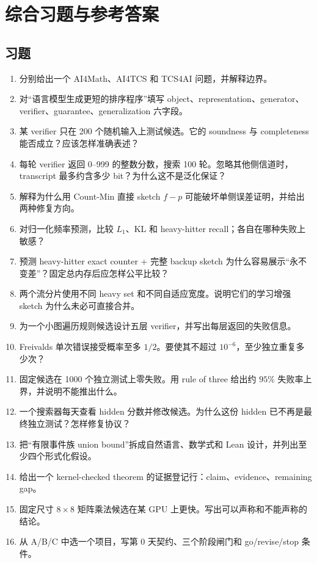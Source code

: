 \chapter{综合习题与参考答案}

\section{习题}

\begin{enumerate}[label=\textbf{X\arabic*.}]
  \item 分别给出一个 AI4Math、AI4TCS 和 TCS4AI 问题，并解释边界。
  \item 对“语言模型生成更短的排序程序”填写 object、representation、generator、verifier、guarantee、generalization 六字段。
  \item 某 verifier 只在 200 个随机输入上测试候选。它的 soundness 与 completeness 能否成立？应该怎样准确表述？
  \item 每轮 verifier 返回 0--999 的整数分数，搜索 100 轮。忽略其他侧信道时，transcript 最多约含多少 bit？为什么这不是泛化保证？
  \item 解释为什么用 Count-Min 直接 sketch $f-p$ 可能破坏单侧误差证明，并给出两种修复方向。
  \item 对归一化频率预测，比较 $L_1$、KL 和 heavy-hitter recall；各自在哪种失败上敏感？
  \item 预测 heavy-hitter exact counter + 完整 backup sketch 为什么容易展示“永不变差”？固定总内存后应怎样公平比较？
  \item 两个流分片使用不同 heavy set 和不同自适应宽度。说明它们的学习增强 sketch 为什么未必可直接合并。
  \item 为一个小图遍历规则候选设计五层 verifier，并写出每层返回的失败信息。
  \item Freivalds 单次错误接受概率至多 $1/2$。要使其不超过 $10^{-6}$，至少独立重复多少次？
  \item 固定候选在 1000 个独立测试上零失败。用 rule of three 给出约 $95\%$ 失败率上界，并说明不能推出什么。
  \item 一个搜索器每天查看 hidden 分数并修改候选。为什么这份 hidden 已不再是最终独立测试？怎样修复协议？
  \item 把“有限事件族 union bound”拆成自然语言、数学式和 Lean 设计，并列出至少四个形式化假设。
  \item 给出一个 kernel-checked theorem 的证据登记行：claim、evidence、remaining gap。
  \item 固定尺寸 $8\times8$ 矩阵乘法候选在某 GPU 上更快。写出可以声称和不能声称的结论。
  \item 从 A/B/C 中选一个项目，写第 0 天契约、三个阶段闸门和 go/revise/stop 条件。
\end{enumerate}

